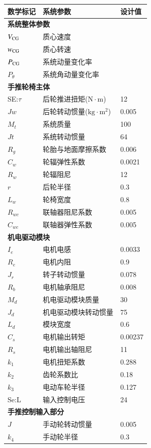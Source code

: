 \begin{table}[H]
	\footnotesize
	\caption{系统主要参数及其数学标记}\label{tab:param}
	\begin{longtable}{l|l|l}
		\toprule
		\textbf{数学标记} & \textbf{系统参数} & \textbf{设计值}\\
		\midrule
		\endhead
		\multicolumn{3}{l}{\textbf{系统整体参数}} \\ %
		\midrule
		$ V_{\rm{CG}} $ & 质心速度 & \\
		$ w_{\rm{CG}} $ & 质心转速 & \\
		$ P_{\rm{CG}} $ & 系统动量变化率 & \\
		$ P_{\theta} $ & 系统角动量变化率 & \\
		\midrule
		\multicolumn{3}{l}{\textbf{手推轮椅主体}} \\
		\midrule
		SE:$\tau$ & 后轮推进扭矩($ \mathrm{N} \cdot \mathrm{m} $) & 12 \\
		$ J w $ & 后轮转动惯量($ \mathrm{kg} \cdot \mathrm{m}^2 $) & 0.005 \\
		$ M_t $ & 系统质量 & 100 \\
		$ J t $ & 系统转动惯量 & 64 \\
		$ R_g $ & 轮胎与地面摩擦系数 & 0.006 \\
		$ C_w $ & 轮辐弹性系数 & 0.0021 \\
		$ R_w $ & 轮辐阻尼 & 12 \\
		$ r $ & 后轮半径 & 0.3 \\
		$ L_w $ & 轮椅宽度 & 0.8 \\
		$ R_{wc} $ & 联轴器阻尼系数 & 0.005 \\
		$ C_{wc} $ & 联轴器弹性系数 & 0.005 \\
		\midrule
		\multicolumn{3}{l}{\textbf{机电驱动模块}} \\
		\midrule
		$ I_e $ & 电机电感 & 0.0033 \\
		$ R_e $ & 电机内阻 & 0.9 \\
		$ J_r $ & 转子转动惯量 & 0.078 \\
		$ R_b $ & 电机轴承阻尼 & 0.008 \\
		$ M_d $ & 机电驱动模块质量 & 30 \\
		$ J_d $ & 机电驱动模块转动惯量 & 75 \\
		$ L_d $ & 模块宽度 & 0.6 \\
		$ C_s $ & 电机输出转矩 & 0.00237\\
		$ R_s $ & 电机输出轴阻尼 & 11 \\
		$ k_1 $ & 电机扭矩系数 & 0.288 \\ %
		$ k_2 $ & 齿轮系数比 & 0.18 \\ %
		$ k_3 $ & 电动车轮半径 & 0.127 \\ %
		Se:L & 输入控制电压 & 24 \\
		\midrule
		\multicolumn{3}{l}{\textbf{手推控制输入部分}}\\
		\midrule
		$ J $ & 手动轮转动惯量 & 0.005 \\
		$ k_4 $ & 手动轮半径 & 0.3 \\ %
		\bottomrule
	\end{longtable}
\end{table}


